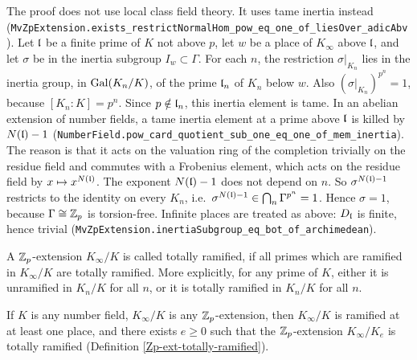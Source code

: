 \begin{remark}
The {\Lean} proof does not use local class field theory. It uses tame inertia
instead
(\texttt{MvZpExtension.exists\_restrictNormalHom\_pow\_eq\_one\_of\_liesOver\_adicAbv}).
Let ${\mathfrak{l}}$ be a finite prime of $K$ not above $p$, let $w$ be a place of
$K_\infty$ above ${\mathfrak{l}}$, and let $\sigma$ be in the inertia subgroup
$I_w\subset\Gamma$. For each $n$, the restriction $\sigma|_{K_n}$ lies in the
inertia group, in ${\mathrm{Gal}}(K_n/K)$, of the prime ${\mathfrak{l}}_n$ of $K_n$ below $w$. Also
$(\sigma|_{K_n})^{p^n}=1$, because $[K_n:K]=p^n$. Since $p\notin{\mathfrak{l}}_n$, this
inertia element is tame. In an abelian extension of number fields, a tame
inertia element at a prime above ${\mathfrak{l}}$ is killed by $N({\mathfrak{l}})-1$
(\texttt{NumberField.pow\_card\_quotient\_sub\_one\_eq\_one\_of\_mem\_inertia}).
The reason is that it acts on the valuation ring of the completion trivially on
the residue field and commutes with a Frobenius element, which acts on the
residue field by $x\mapsto x^{N({\mathfrak{l}})}$. The exponent $N({\mathfrak{l}})-1$ does not depend
on $n$. So $\sigma^{N({\mathfrak{l}})-1}$ restricts to the identity on every $K_n$,
i.e.~$\sigma^{N({\mathfrak{l}})-1}\in\bigcap_n\Gamma^{p^n}=1$. Hence $\sigma=1$, because
$\Gamma\cong{\mathbb {Z}}_p$ is torsion-free. Infinite places are treated as above:
$D_{\mathfrak{l}}$ is finite, hence trivial
(\texttt{MvZpExtension.inertiaSubgroup\_eq\_bot\_of\_archimedean}).
\end{remark}

\begin{definition}
\label{Zp-ext-totally-ramified}
A ${\mathbb {Z}}_p$-extension $K_\infty/K$ is called totally ramified, if
all primes which are ramified in $K_\infty/K$ are totally ramified.
More explicitly, for any prime of $K$,
either it is unramified in $K_n/K$ for all $n$,
or it is totally ramified in $K_n/K$ for all $n$.
\end{definition}

\begin{lem}
\label{exists-totally-ramified}
If $K$ is any number field, $K_\infty/K$ is any ${\mathbb {Z}}_p$-extension,
then $K_\infty/K$ is ramified at at least one place,
and there exists $e\geq 0$ such that the ${\mathbb {Z}}_p$-extension $K_\infty/K_e$
is totally ramified (Definition \ref{Zp-ext-totally-ramified}).
\end{lem}

